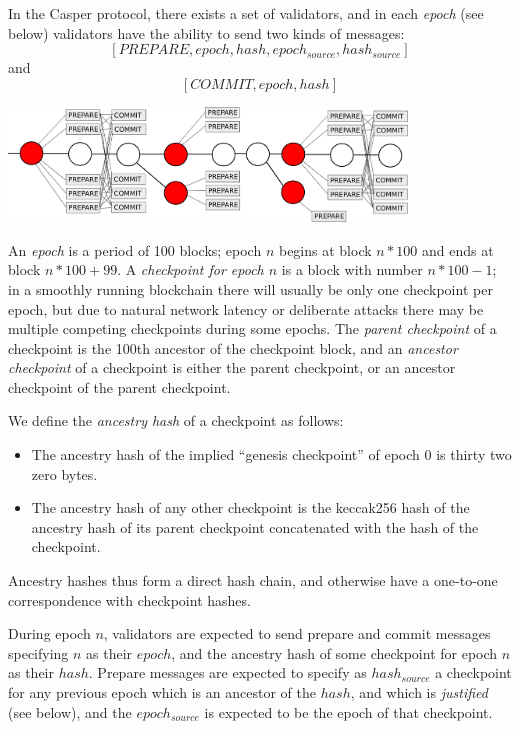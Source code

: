 \documentclass[12pt]{article}
\begin{document}
In the Casper protocol, there exists a set of validators, and in each \textit{epoch} (see below) validators have the ability to send two kinds of messages: $$[PREPARE, epoch, hash, epoch_{source}, hash_{source}]$$ and $$[COMMIT, epoch, hash]$$

\includegraphics[width=400px]{prepares_commits.png}

An \textit{epoch} is a period of 100 blocks; epoch $n$ begins at block $n * 100$ and ends at block $n * 100 + 99$. A \textit{checkpoint for epoch $n$} is a block with number $n * 100 - 1$; in a smoothly running blockchain there will usually be only one checkpoint per epoch, but due to natural network latency or deliberate attacks there may be multiple competing checkpoints during some epochs. The \textit{parent checkpoint} of a checkpoint is the 100th ancestor of the checkpoint block, and an \textit{ancestor checkpoint} of a checkpoint is either the parent checkpoint, or an ancestor checkpoint of the parent checkpoint.

We define the \textit{ancestry hash} of a checkpoint as follows:

\begin{itemize}
\item The ancestry hash of the implied ``genesis checkpoint'' of epoch 0 is thirty two zero bytes.
\item The ancestry hash of any other checkpoint is the keccak256 hash of the ancestry hash of its parent checkpoint concatenated with the hash of the checkpoint.
\end{itemize}

Ancestry hashes thus form a direct hash chain, and otherwise have a one-to-one correspondence with checkpoint hashes.

During epoch $n$, validators are expected to send prepare and commit messages specifying $n$ as their $epoch$, and the ancestry hash of some checkpoint for epoch $n$ as their $hash$. Prepare messages are expected to specify as $hash_{source}$ a checkpoint for any previous epoch which is an ancestor of the $hash$, and which is \textit{justified} (see below), and the $epoch_{source}$ is expected to be the epoch of that checkpoint.
\end{document}
